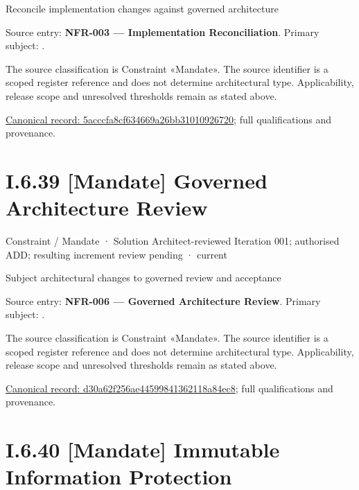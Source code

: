 Reconcile implementation changes against governed architecture



Source entry: \textbf{NFR-003 — Implementation Reconciliation}. Primary subject: \texttt{}.



The source classification is Constraint «Mandate». The source identifier is a scoped register reference and does not determine architectural type. Applicability, release scope and unresolved thresholds remain as stated above.


{\footnotesize \href{../../../../../../../continuum/motivation/constraint/mandate/5acccfa8cf634669a26bb31010926720.md}{Canonical record: 5acccfa8cf634669a26bb31010926720}; full qualifications and provenance.}\par
\section*{I.6.39 [Mandate] Governed Architecture Review}
\label{navigation:I.6.39}

\label{element:d30a62f256ae44599841362118a84ec8}
{\small Constraint / Mandate · Solution Architect-reviewed Iteration 001; authorised ADD; resulting increment review pending · current}\par

Subject architectural changes to governed review and acceptance



Source entry: \textbf{NFR-006 — Governed Architecture Review}. Primary subject: \texttt{}.



The source classification is Constraint «Mandate». The source identifier is a scoped register reference and does not determine architectural type. Applicability, release scope and unresolved thresholds remain as stated above.


{\footnotesize \href{../../../../../../../continuum/motivation/constraint/mandate/d30a62f256ae44599841362118a84ec8.md}{Canonical record: d30a62f256ae44599841362118a84ec8}; full qualifications and provenance.}\par
\section*{I.6.40 [Mandate] Immutable Information Protection}
\label{navigation:I.6.40}

